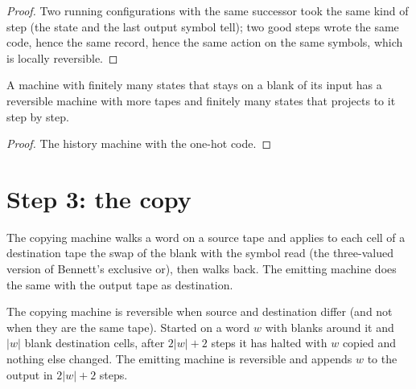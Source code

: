 \begin{proof}
  \leanok
  Two running configurations with the same successor took the same kind of step (the state and the
  last output symbol tell); two good steps wrote the same code, hence the same record, hence the
  same action on the same symbols, which is locally reversible.
\end{proof}

\begin{theorem}
  \label{thm:history}
  \leanok
  A machine with finitely many states that stays on a blank of its input has a reversible machine
  with more tapes and finitely many states that projects to it step by step.
\end{theorem}

\begin{proof}
  \leanok
  The history machine with the one-hot code.
\end{proof}

\section{Step 3: the copy}

\begin{definition}
  \label{def:copyTM}
  \leanok
  The copying machine walks a word on a source tape and applies to each cell of a destination tape
  the swap of the blank with the symbol read (the three-valued version of Bennett's exclusive or),
  then walks back. The emitting machine does the same with the output tape as destination.
\end{definition}

\begin{theorem}
  \label{thm:copy}
  \leanok
  The copying machine is reversible when source and destination differ (and not when they are the
  same tape). Started on a word $w$ with blanks around it and $|w|$ blank destination cells, after
  $2|w| + 2$ steps it has halted with $w$ copied and nothing else changed. The emitting machine is
  reversible and appends $w$ to the output in $2|w| + 2$ steps.
\end{theorem}

